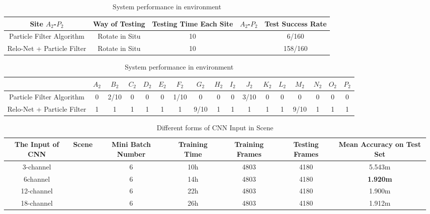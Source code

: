 \documentclass[journal]{IEEEtran}
\begin{document}
\begin{table}[]
	\centering
	\caption{ System performance in environment \uppercase\expandafter{}}
	\begin{tabular}{c|c|c|c|c}
		\hline
		Site $A_2$-$P_2$               & Way of Testing & Testing Time Each Site & $A_2$-$P_2$ & Test Success Rate \\ \hline
		Particle Filter Algorithm  & Rotate in Situ & 10                     &         &  6/160                \\ \hline
		Relo-Net + Particle Filter & Rotate in Situ & 10                     &         &  158/160           \\ \hline
	\end{tabular}
	\label{tablemap2} 

	\centering
	\begin{tabular}{c|c|c|c|c|c|c|c|c|c|c|c|c|c|c|c|c}
		\hline
		& $A_2$  & $B_2$ & $C_2$ & $D_2$ &$ E_2 $ & $F_2$ & $G_2$ & $H_2$ &$ I_2$  & $J_2$ & $K_2$ & $L_2$  & $M_2$ & $N_2$ & $O_2$ & $P_2$ \\ \hline
		Particle Filter Algorithm  & 0   & 2/10 & 0   & 0   & 0   & 1/10 & 0    & 0   & 0   & 3/10 & 0   & 0   & 0    & 0   & 0   & 0   \\ \hline
		Relo-Net + Particle Filter & 1   & 1    & 1   & 1   & 1   & 1    & 9/10 & 1   & 1   & 1    & 1   & 1   & 9/10 & 1   & 1   & 1   \\ \hline
	\end{tabular}
\end{table}


\begin{table}[]
	\centering
	\caption{ Different forms of CNN Input in Scene \uppercase\expandafter{}}
	\begin{tabular}{c|c|c|c|c|c|c}
		\hline
		The Input of CNN & Scene                                  & Mini Batch Number & Training Time & Training Frames & Testing Frames & Mean Accuracy on Test Set \\ \hline
		3-channel        & \uppercase\expandafter{\romannumeral1} & 6                 & 10h           & 4803            & 4180           & 5.543m                    \\ \hline
		6channel         & \uppercase\expandafter{\romannumeral1} & 6                 & 14h           & 4803            & 4180           & \textbf{1.920m}            \\ \hline
		12-channel       & \uppercase\expandafter{\romannumeral1} & 6                 & 22h           & 4803            & 4180           & 1.900m                   \\ \hline
		18-channel       & \uppercase\expandafter{\romannumeral1} & 6                 & 26h           & 4803            & 4180           & 1.912m                    \\ \hline
	\end{tabular}
	\label{tabchan1} 
\end{table}
\end{document}
